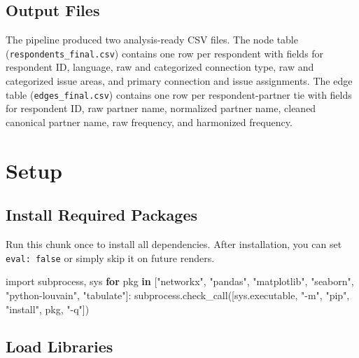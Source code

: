 \documentclass[
  letterpaper,
  DIV=11,
  numbers=noendperiod]{scrartcl}
\newenvironment{Shaded}{\begin{snugshade}}{\end{snugshade}}
\newcommand{\ControlFlowTok}[1]{\textcolor[rgb]{0.00,0.23,0.31}{\textbf{#1}}}
\newcommand{\ImportTok}[1]{\textcolor[rgb]{0.00,0.46,0.62}{#1}}
\newcommand{\KeywordTok}[1]{\textcolor[rgb]{0.00,0.23,0.31}{\textbf{#1}}}
\newcommand{\NormalTok}[1]{\textcolor[rgb]{0.00,0.23,0.31}{#1}}
\newcommand{\StringTok}[1]{\textcolor[rgb]{0.13,0.47,0.30}{#1}}
\begin{document}
\subsection{Output Files}\label{output-files}

The pipeline produced two analysis-ready CSV files. The node table
(\texttt{respondents\_final.csv}) contains one row per respondent with
fields for respondent ID, language, raw and categorized connection type,
raw and categorized issue areas, and primary connection and issue
assignments. The edge table (\texttt{edges\_final.csv}) contains one row
per respondent-partner tie with fields for respondent ID, raw partner
name, normalized partner name, cleaned canonical partner name, raw
frequency, and harmonized frequency.

\section{Setup}\label{setup}

\subsection{Install Required Packages}\label{install-required-packages}

Run this chunk once to install all dependencies. After installation, you
can set \texttt{eval:\ false} or simply skip it on future renders.

\label{install-packages}
\begin{Shaded}
\begin{Highlighting}[]
\ImportTok{import}\NormalTok{ subprocess, sys}
\ControlFlowTok{for}\NormalTok{ pkg }\KeywordTok{in}\NormalTok{ [}\StringTok{"networkx"}\NormalTok{, }\StringTok{"pandas"}\NormalTok{, }\StringTok{"matplotlib"}\NormalTok{, }\StringTok{"seaborn"}\NormalTok{,}
            \StringTok{"python{-}louvain"}\NormalTok{, }\StringTok{"tabulate"}\NormalTok{]:}
\NormalTok{    subprocess.check\_call([sys.executable, }\StringTok{"{-}m"}\NormalTok{, }\StringTok{"pip"}\NormalTok{,}
                           \StringTok{"install"}\NormalTok{, pkg, }\StringTok{"{-}q"}\NormalTok{])}
\end{Highlighting}
\end{Shaded}

\subsection{Load Libraries}\label{load-libraries}
\end{document}
